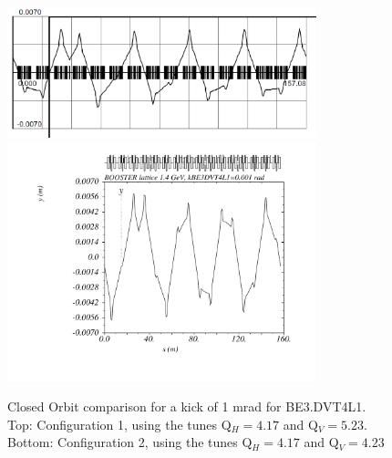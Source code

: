 \documentclass[11pt,letter,english]{article}
\begin{document}
\begin{figure}[!hbtp]
  \begin{center}
    \includegraphics[width=0.8\textwidth]{figs/LINC-BE_DVT4L1.png}
    \includegraphics[width=0.8\textwidth]{figs/psb_orbit_kBE3DVT4L1at0p001rad_l2014tobias.pdf}
    \caption{Closed Orbit comparison for a kick of 1 mrad for BE3.DVT4L1. Top: Configuration 1, using the tunes Q$_H=4.17$ and Q$_V=5.23$. Bottom: Configuration 2, using the tunes Q$_H=4.17$ and Q$_V=4.23$}
    \label{fig:BE_DVT4L1}
  \end{center}
\end{figure}
\end{document}
